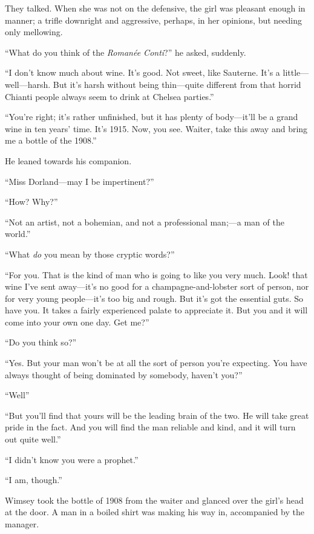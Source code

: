 They talked. When she was not on the defensive, the girl was pleasant enough in manner; a trifle downright and aggressive, perhaps, in her opinions, but needing only mellowing.

\enquote{What do you think of the \textit{Romanée Conti}?} he asked, suddenly.

\enquote{I don't know much about wine. It's good. Not sweet, like Sauterne. It's a little\allowbreak---\allowbreak well---harsh. But it's harsh without being thin\allowbreak---\allowbreak quite different from that horrid Chianti people always seem to drink at Chelsea parties.}

\enquote{You're right; it's rather unfinished, but it has plenty of body\allowbreak---\allowbreak it'll be a grand wine in ten years' time. It's 1915. Now, you see. Waiter, take this away and bring me a bottle of the 1908.}

He leaned towards his companion.

\enquote{Miss Dorland\allowbreak---\allowbreak may I be impertinent?}

\enquote{How? Why?}

\enquote{Not an artist, not a bohemian, and not a professional man;---a man of the world.}

\enquote{What \textit{do} you mean by those cryptic words?}

\enquote{For you. That is the kind of man who is going to like you very much. Look! that wine I've sent away\allowbreak---\allowbreak it's no good for a champagne-and-lobster sort of person, nor for very young people\allowbreak---\allowbreak it's too big and rough. But it's got the essential guts. So have you. It takes a fairly experienced palate to appreciate it. But you and it will come into your own one day. Get me?}

\enquote{Do you think so?}

\enquote{Yes. But your man won't be at all the sort of person you're expecting. You have always thought of being dominated by somebody, haven't you?}

\enquote{Well\longdash}

\enquote{But you'll find that yours will be the leading brain of the two. He will take great pride in the fact. And you will find the man reliable and kind, and it will turn out quite well.}

\enquote{I didn't know you were a prophet.}

\enquote{I am, though.}

Wimsey took the bottle of 1908 from the waiter and glanced over the girl's head at the door. A man in a boiled shirt was making his way in, accompanied by the manager.

